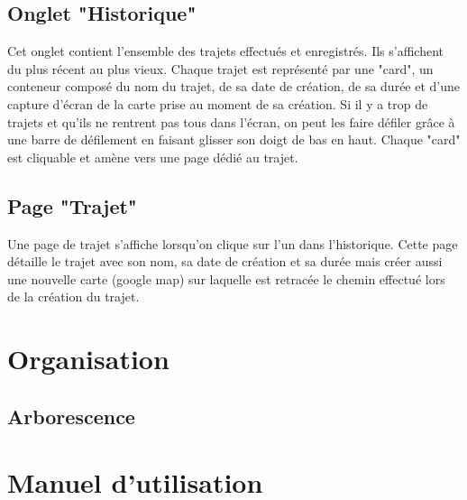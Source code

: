\documentclass{article}
\begin{document}
\subsection{Onglet "Historique"}
Cet onglet contient l'ensemble des trajets effectués et enregistrés. Ils s'affichent du plus récent au plus vieux. Chaque trajet est représenté
par une "card", un conteneur composé du nom du trajet, de sa date de création, de sa durée et d'une capture d'écran de la carte prise au moment
de sa création. Si il y a trop de trajets et qu'ils ne rentrent pas tous dans l'écran, on peut les faire défiler grâce à une barre de défilement
en faisant glisser son doigt de bas en haut. Chaque "card" est cliquable et amène vers une page dédié au trajet.

\subsection{Page "Trajet"}
Une page de trajet s'affiche lorsqu'on clique sur l'un dans l'historique. Cette page détaille le trajet avec son nom, sa date de création et
sa durée mais créer aussi une nouvelle carte (google map) sur laquelle est retracée le chemin effectué lors de la création du trajet.

\section{Organisation}
\subsection{Arborescence}

\newpage
\appendix
\section{Manuel d'utilisation}
\end{document}

